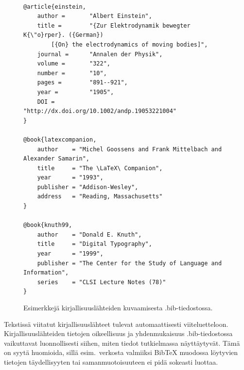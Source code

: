\begin{figure}[ht]
    \centering
    \begin{scriptsize}
\begin{verbatim}

@article{einstein,
    author =       "Albert Einstein",
    title =        "{Zur Elektrodynamik bewegter K{\"o}rper}. ({German})
        [{On} the electrodynamics of moving bodies]",
    journal =      "Annalen der Physik",
    volume =       "322",
    number =       "10",
    pages =        "891--921",
    year =         "1905",
    DOI =          "http://dx.doi.org/10.1002/andp.19053221004"
}

@book{latexcompanion,
    author    = "Michel Goossens and Frank Mittelbach and Alexander Samarin",
    title     = "The \LaTeX\ Companion",
    year      = "1993",
    publisher = "Addison-Wesley",
    address   = "Reading, Massachusetts"
}

@book{knuth99,
    author    = "Donald E. Knuth",
    title     = "Digital Typography",
    year      = "1999",
    publisher = "The Center for the Study of Language and Information",
    series    = "CLSI Lecture Notes (78)"
}
\end{verbatim}
\end{scriptsize}
    \caption{Esimerkkejä kirjallisuuslähteiden kuvaamisesta .bib-tiedostossa.}
    \label{bibexamples-fi}
\end{figure}


Tekstissä viitatut kirjallisuuslähteet tulevat automaattisesti viiteluetteloon. Kirjallisuuslähteiden tietojen oikeellisuus ja yhdenmukaisuus .bib-tiedostossa vaikuttavat luonnollisesti siihen, miten tiedot tutkielmassa näyttäytyvät. Tämä on syytä huomioida, sillä esim.\ verkosta valmiiksi {Bib\TeX} muodossa löytyvien tietojen täydellisyyten tai samanmuotoisuuteen ei pidä sokeasti luottaa.  


